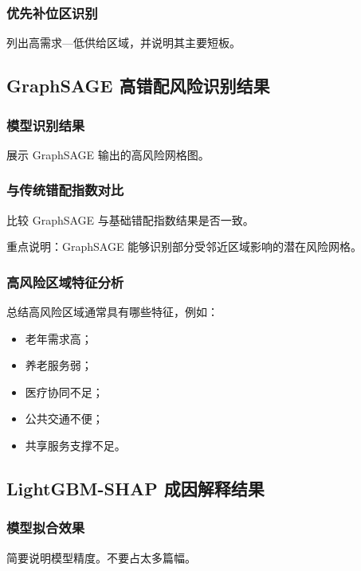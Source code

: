 \documentclass[UTF8,zihao=-4,a4paper,fontset=none]{ctexart}
\begin{document}
\subsubsection{优先补位区识别}

列出高需求—低供给区域，并说明其主要短板。

\subsection{GraphSAGE 高错配风险识别结果}

\subsubsection{模型识别结果}

展示 GraphSAGE 输出的高风险网格图。

\subsubsection{与传统错配指数对比}

比较 GraphSAGE 与基础错配指数结果是否一致。

重点说明：GraphSAGE 能够识别部分受邻近区域影响的潜在风险网格。

\subsubsection{高风险区域特征分析}

总结高风险区域通常具有哪些特征，例如：

\begin{itemize}
\item 老年需求高；
\item 养老服务弱；
\item 医疗协同不足；
\item 公共交通不便；
\item 共享服务支撑不足。
\end{itemize}

\subsection{LightGBM-SHAP 成因解释结果}

\subsubsection{模型拟合效果}

简要说明模型精度。不要占太多篇幅。
\end{document}
